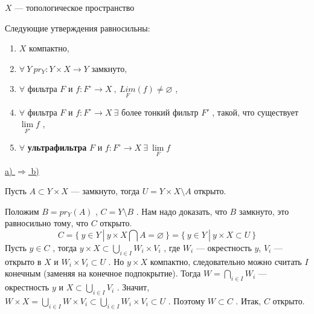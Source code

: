 \pagebreak

\SSbullet 
\begin{center}
    \( X \) --- топологическое пространство
\end{center}

\SSsect[!] Следующие утверждения равносильны:
\begin{enumerate}[label={\alph*)}]
\item \( X \) компактно,
\item \( \forall~ Y ~ pr_Y: Y \times X \rightarrow Y \) замкнуто,
\item \( \forall \) фильтра \( F \) и \( f:F^{\circ} \rightarrow X ~,~ \underset{F}{Lim}(f) \neq \varnothing \) ,
\item \( \forall \) фильтра \( F \) и \( f:F^{\circ} \rightarrow X ~\exists \) более тонкий фильтр \( F' \) , такой, что существует \( \lim\limits_{F'} f \) ,
\item \( \forall \) \textbf{ультрафильтра} \( F \) и \( f:F^{\circ} \rightarrow X ~\exists~ \lim\limits_{F} f \)
\end{enumerate}

\SSproof

\underline{a) \( \Rightarrow \) b)}
\vspace

Пусть \( A \subset Y \times X \) --- замкнуто, тогда \( U = Y \times X \setminus A \) открыто.


Положим \( B = pr_Y(A) \) , \( C = Y \setminus B \) . Нам надо доказать, что \( B \) замкнуто, это равносильно тому, что \( C \) открыто.
\[ C = \{~y \in Y~|~y \times X \bigcap A = \varnothing ~\} = \{~y \in Y~|~y \times X \subset U ~\} \]
Пусть \( y \in C \) , тогда \( y \times X \subset \underset{i \in I}{\bigcup} W_i \times V_i \) , где \( W_i \) --- окрестность \( y \), \( V_i \) --- открыто в \( X \) и \( W_i \times V_i \subset U \) . Но \( y \times X \) компактно, следовательно можно считать \( I \) конечным (заменяя на конечное подпокрытие). Тогда \( W = \underset{i \in I}{\bigcap} W_i \) --- окрестность \( y \) и \( X \subset \underset{i \in I}{\bigcup} V_i \) . Значит, \( W \times X = \underset{i \in I}{\bigcup} W \times V_i \subset \underset{i \in I}{\bigcup} W_i \times V_i \subset U \) . Поэтому \( W \subset C \) . Итак, \( C \) открыто.


